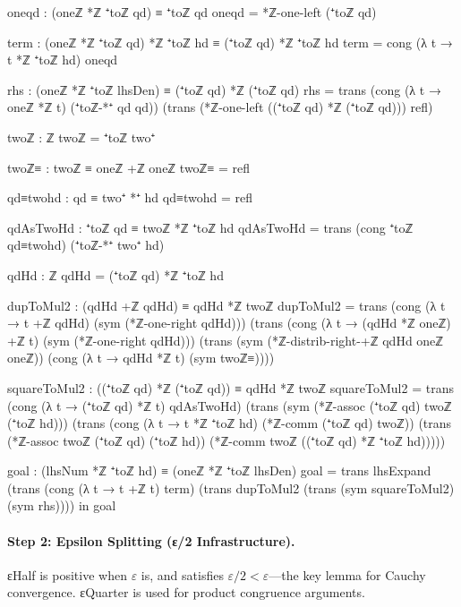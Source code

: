 \documentclass[11pt,a4paper]{book}
\def\texttt#1{#1}%
\begin{document}
\begin{code}
    oneqd : (oneℤ *ℤ ⁺toℤ qd) ≡ ⁺toℤ qd
    oneqd = *ℤ-one-left (⁺toℤ qd)

    term : (oneℤ *ℤ ⁺toℤ qd) *ℤ ⁺toℤ hd ≡ (⁺toℤ qd) *ℤ ⁺toℤ hd
    term = cong (λ t → t *ℤ ⁺toℤ hd) oneqd

    rhs : (oneℤ *ℤ ⁺toℤ lhsDen) ≡ (⁺toℤ qd) *ℤ (⁺toℤ qd)
    rhs =
      trans
        (cong (λ t → oneℤ *ℤ t) (⁺toℤ-*⁺ qd qd))
        (trans
          (*ℤ-one-left ((⁺toℤ qd) *ℤ (⁺toℤ qd)))
          refl)

    twoℤ : ℤ
    twoℤ = ⁺toℤ two⁺

    twoℤ≡ : twoℤ ≡ oneℤ +ℤ oneℤ
    twoℤ≡ = refl

    qd≡twohd : qd ≡ two⁺ *⁺ hd
    qd≡twohd = refl

    qdAsTwoHd : ⁺toℤ qd ≡ twoℤ *ℤ ⁺toℤ hd
    qdAsTwoHd = trans (cong ⁺toℤ qd≡twohd) (⁺toℤ-*⁺ two⁺ hd)

    qdHd : ℤ
    qdHd = (⁺toℤ qd) *ℤ ⁺toℤ hd

    dupToMul2 : (qdHd +ℤ qdHd) ≡ qdHd *ℤ twoℤ
    dupToMul2 =
      trans
        (cong (λ t → t +ℤ qdHd) (sym (*ℤ-one-right qdHd)))
        (trans
          (cong (λ t → (qdHd *ℤ oneℤ) +ℤ t) (sym (*ℤ-one-right qdHd)))
          (trans
            (sym (*ℤ-distrib-right-+ℤ qdHd oneℤ oneℤ))
            (cong (λ t → qdHd *ℤ t) (sym twoℤ≡))))

    squareToMul2 : ((⁺toℤ qd) *ℤ (⁺toℤ qd)) ≡ qdHd *ℤ twoℤ
    squareToMul2 =
      trans
        (cong (λ t → (⁺toℤ qd) *ℤ t) qdAsTwoHd)
        (trans
          (sym (*ℤ-assoc (⁺toℤ qd) twoℤ (⁺toℤ hd)))
          (trans
            (cong (λ t → t *ℤ ⁺toℤ hd) (*ℤ-comm (⁺toℤ qd) twoℤ))
            (trans
              (*ℤ-assoc twoℤ (⁺toℤ qd) (⁺toℤ hd))
              (*ℤ-comm twoℤ ((⁺toℤ qd) *ℤ ⁺toℤ hd)))))

    goal : (lhsNum *ℤ ⁺toℤ hd) ≡ (oneℤ *ℤ ⁺toℤ lhsDen)
    goal =
      trans
        lhsExpand
        (trans
          (cong (λ t → t +ℤ t) term)
          (trans
            dupToMul2
            (trans (sym squareToMul2) (sym rhs))))
  in
  goal
\end{code}

\paragraph{Step 2: Epsilon Splitting (ε/2 Infrastructure).}
\texttt{εHalf} is positive when $\varepsilon$ is, and satisfies
$\varepsilon/2 < \varepsilon$---the key lemma for Cauchy convergence.
\texttt{εQuarter} is used for product congruence arguments.
\end{document}
